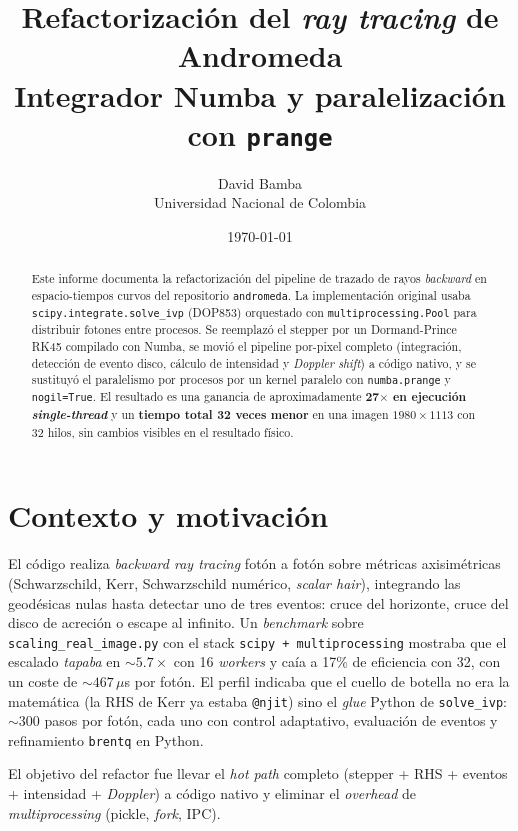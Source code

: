 \documentclass[11pt,a4paper]{article}
\title{Refactorización del \emph{ray tracing} de Andromeda\\
\large Integrador Numba y paralelización con \texttt{prange}}
\author{David Bamba\\\small Universidad Nacional de Colombia}
\date{\today}
\begin{document}
\maketitle

\begin{abstract}
Este informe documenta la refactorización del pipeline de trazado de rayos
\emph{backward} en espacio-tiempos curvos del repositorio \texttt{andromeda}.
La implementación original usaba \texttt{scipy.integrate.solve\_ivp} (DOP853)
orquestado con \texttt{multiprocessing.Pool} para distribuir fotones entre
procesos. Se reemplazó el stepper por un Dormand-Prince RK45 compilado con
Numba, se movió el pipeline por-pixel completo (integración,
detección de evento disco, cálculo de intensidad y \emph{Doppler shift})
a código nativo, y se sustituyó el paralelismo por procesos por un kernel
paralelo con \texttt{numba.prange} y \texttt{nogil=True}. El resultado es
una ganancia de aproximadamente \textbf{27$\times$ en ejecución
\emph{single-thread}} y un \textbf{tiempo total 32 veces menor} en una
imagen $1980\times 1113$ con 32 hilos, sin cambios visibles en el
resultado físico.
\end{abstract}

\section{Contexto y motivación}

El código realiza \emph{backward ray tracing} fotón a fotón sobre métricas
axisimétricas (Schwarzschild, Kerr, Schwarzschild numérico, \emph{scalar
hair}), integrando las geodésicas nulas hasta detectar uno de tres eventos:
cruce del horizonte, cruce del disco de acreción o escape al infinito. Un
\emph{benchmark} sobre \texttt{scaling\_real\_image.py} con el stack
\texttt{scipy + multiprocessing} mostraba que el escalado \emph{tapaba}
en $\sim 5.7\times$ con 16 \emph{workers} y caía a 17\% de eficiencia con
32, con un coste de $\sim 467\,\mu$s por fotón. El perfil indicaba que
el cuello de botella no era la matemática (la RHS de Kerr ya estaba
\texttt{@njit}) sino el \emph{glue} Python de \texttt{solve\_ivp}:
$\sim 300$ pasos por fotón, cada uno con control adaptativo, evaluación
de eventos y refinamiento \texttt{brentq} en Python.

El objetivo del refactor fue llevar el \emph{hot path} completo
(stepper + RHS + eventos + intensidad + \emph{Doppler}) a código nativo y
eliminar el \emph{overhead} de \emph{multiprocessing} (pickle, \emph{fork},
IPC).
\end{document}
